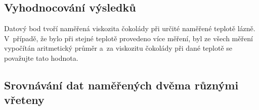 \documentclass[12pt]{article}
\begin{document}
\subsection{Vyhodnocování výsledků}%

Datový bod tvoří naměřená viskozita čokolády při určité naměřené teplotě lázně. V~případě, že bylo při stejné teplotě provedeno více měření, byl ze všech měření vypočítán aritmetický průměr a~za viskozitu čokolády při dané teplotě se považujte tato hodnota.

\subsection{Srovnávání dat naměřených dvěma různými vřeteny}%
\end{document}
